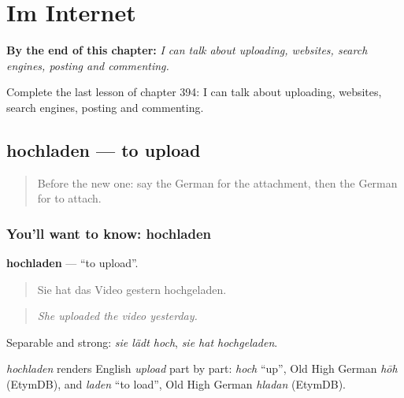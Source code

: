 
\chapter{Im Internet}
\label{ch:ge-im-internet}

\begin{chapteropening}
\textbf{By the end of this chapter:} \emph{I can talk about uploading, websites, search engines, posting and commenting.}

Complete the last lesson of chapter 394: I can talk about uploading, websites, search engines, posting and commenting.
\end{chapteropening}

\section[hochladen]{hochladen — to upload}

\label{lesson:GE-C394-hochladen}



\begin{quote}
Before the new one: say the German for the attachment, then the German for to attach.
\end{quote}

\subsection*{You'll want to know: hochladen}
\textbf{hochladen} — \textquotedblleft{}to upload\textquotedblright{}.

\begin{quote}
Sie hat das Video gestern hochgeladen.
\end{quote}

\begin{quote}
\emph{She uploaded the video yesterday.}
\end{quote}

Separable and strong: \emph{sie lädt hoch}, \emph{sie hat hochgeladen}.

\begin{cousinweb}
\emph{hochladen} renders English \emph{upload} part by part: \emph{hoch} \textquotedblleft{}up\textquotedblright{}, Old High German \emph{hōh} (EtymDB), and \emph{laden} \textquotedblleft{}to load\textquotedblright{}, Old High German \emph{hladan} (EtymDB).
\end{cousinweb}

